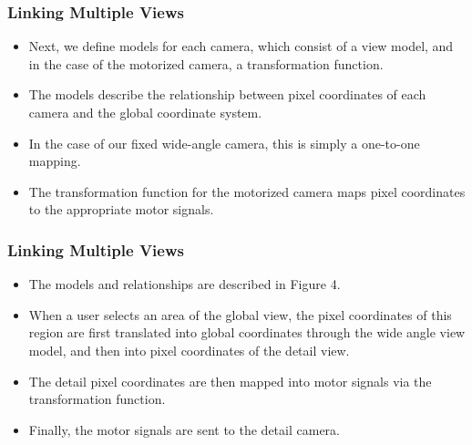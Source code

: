 \documentclass{beamer}
\begin{document}
\begin{frame}
\frametitle{Linking Multiple Views}

\begin{itemize}
\item Next, we define models for each camera, which consist of a view model, and in the case of the motorized camera, a transformation function.
\item The models describe the relationship between pixel coordinates of each camera and the global coordinate system.
\item In the case of our fixed wide-angle camera, this is simply a one-to-one mapping.
\item The transformation function for the motorized camera maps pixel coordinates to the appropriate motor signals.
\end{itemize}

\end{frame}

\begin{frame}
\frametitle{Linking Multiple Views}

\begin{itemize}
\item The models and relationships are described in Figure 4.
\item When a user selects an area of the global view, the pixel coordinates of this region are first translated into global coordinates through the wide angle view model, and then into pixel coordinates of the detail view.
\item The detail pixel coordinates are then mapped into motor signals via the transformation function.
\item Finally, the motor signals are sent to the detail camera.
\end{itemize}

\end{frame}
\end{document}
